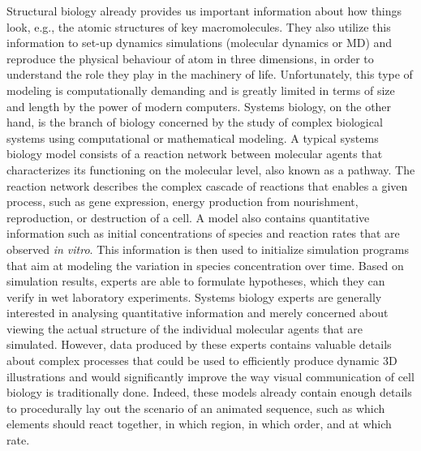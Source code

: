 Structural biology already provides us important information about how things look, e.g., the atomic structures of key macromolecules.
They also utilize this information to set-up dynamics simulations (molecular dynamics or MD) and reproduce the physical behaviour of atom in three dimensions, in order to understand the role they play in the machinery of life.
Unfortunately, this type of modeling is computationally demanding and is greatly limited in terms of size and length by the power of modern computers.
Systems biology, on the other hand, is the branch of biology concerned by the study of complex biological systems using computational or mathematical modeling.
A typical systems biology model consists of a reaction network between molecular agents that characterizes its functioning on the molecular level, also known as a pathway.
The reaction network describes the complex cascade of reactions that enables a given process, such as gene expression, energy production from nourishment, reproduction, or destruction of a cell.
A model also contains quantitative information such as initial concentrations of species and reaction rates that are observed \textit{in vitro}.
This information is then used to initialize simulation programs that aim at modeling the variation in species concentration over time.
Based on simulation results, experts are able to formulate hypotheses, which they can verify in wet laboratory experiments.
Systems biology experts are generally interested in analysing quantitative information and merely concerned about viewing the actual structure of the individual molecular agents that are simulated.
However, data produced by these experts contains valuable details about complex processes that could be used to efficiently produce dynamic 3D illustrations and would significantly improve the way visual communication of cell biology is traditionally done. 
Indeed, these models already contain enough details to procedurally lay out the scenario of an animated sequence, such as which elements should react together, in which region, in which order, and at which rate.

